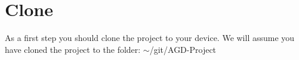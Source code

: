 \section{Clone}
	As a first step you should clone the project to your device.
	We will assume you have cloned the project to the folder: $\sim$/git/AGD-Project